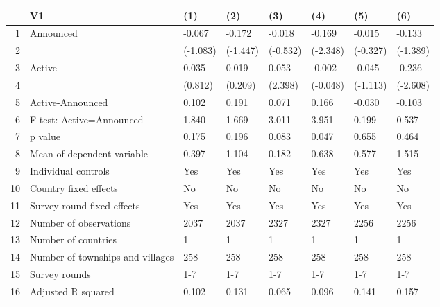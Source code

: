 \begin{table}[ht]
\centering
\begin{tabular}{rlllllll}
  \hline
 & V1 & (1) & (2) & (3) & (4) & (5) & (6) \\ 
  \hline
1 & Announced & -0.067 & -0.172 & -0.018 & -0.169 & -0.015 & -0.133 \\ 
  2 &  & (-1.083) & (-1.447) & (-0.532) & (-2.348) & (-0.327) & (-1.389) \\ 
  3 & Active & 0.035 & 0.019 & 0.053 & -0.002 & -0.045 & -0.236 \\ 
  4 &  & (0.812) & (0.209) & (2.398) & (-0.048) & (-1.113) & (-2.608) \\ 
  5 & Active-Announced & 0.102 & 0.191 & 0.071 & 0.166 & -0.030 & -0.103 \\ 
  6 & F test: Active=Announced & 1.840 & 1.669 & 3.011 & 3.951 & 0.199 & 0.537 \\ 
  7 & p value & 0.175 & 0.196 & 0.083 & 0.047 & 0.655 & 0.464 \\ 
  8 & Mean of dependent variable & 0.397 & 1.104 & 0.182 & 0.638 & 0.577 & 1.515 \\ 
  9 & Individual controls & Yes & Yes & Yes & Yes & Yes & Yes \\ 
  10 & Country fixed effects & No & No & No & No & No & No \\ 
  11 & Survey round fixed effects & Yes & Yes & Yes & Yes & Yes & Yes \\ 
  12 & Number of observations & 2037 & 2037 & 2327 & 2327 & 2256 & 2256 \\ 
  13 & Number of countries & 1 & 1 & 1 & 1 & 1 & 1 \\ 
  14 & Number of townships and villages & 258 & 258 & 258 & 258 & 258 & 258 \\ 
  15 & Survey rounds & 1-7 & 1-7 & 1-7 & 1-7 & 1-7 & 1-7 \\ 
  16 & Adjusted R squared & 0.102 & 0.131 & 0.065 & 0.096 & 0.141 & 0.157 \\ 
   \hline
\end{tabular}
\end{table}

